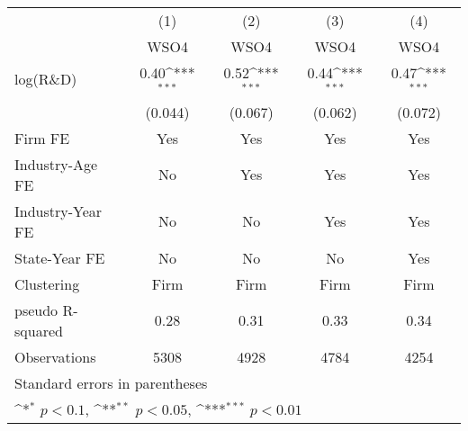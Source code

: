 {
\def\sym#1{\ifmmode^{#1}\else\(^{#1}\)\fi}
\begin{tabular}{l*{4}{c}}
\toprule
                    &\multicolumn{1}{c}{(1)}&\multicolumn{1}{c}{(2)}&\multicolumn{1}{c}{(3)}&\multicolumn{1}{c}{(4)}\\
                    &\multicolumn{1}{c}{WSO4}&\multicolumn{1}{c}{WSO4}&\multicolumn{1}{c}{WSO4}&\multicolumn{1}{c}{WSO4}\\
\midrule
log(R\&D)           &        0.40\sym{***}&        0.52\sym{***}&        0.44\sym{***}&        0.47\sym{***}\\
                    &     (0.044)         &     (0.067)         &     (0.062)         &     (0.072)         \\
\addlinespace
Firm FE             &         Yes         &         Yes         &         Yes         &         Yes         \\
\addlinespace
Industry-Age FE     &          No         &         Yes         &         Yes         &         Yes         \\
\addlinespace
Industry-Year FE    &          No         &          No         &         Yes         &         Yes         \\
\addlinespace
State-Year FE       &          No         &          No         &          No         &         Yes         \\
\midrule
Clustering          &       Firm         &       Firm         &       Firm         &       Firm         \\
pseudo R-squared    &        0.28         &        0.31         &        0.33         &        0.34         \\
Observations        &        5308         &        4928         &        4784         &        4254         \\
\bottomrule
\multicolumn{5}{l}{\footnotesize Standard errors in parentheses}\\
\multicolumn{5}{l}{\footnotesize \sym{*} \(p<0.1\), \sym{**} \(p<0.05\), \sym{***} \(p<0.01\)}\\
\end{tabular}
}
